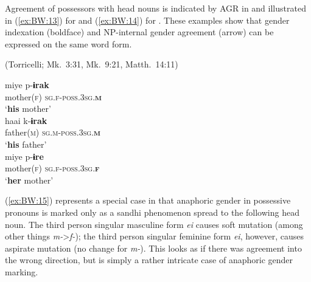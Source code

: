 \documentclass[output=collectionpaper]{langsci/langscibook}
\begin{document}
Agreement of possessors with head nouns is indicated by AGR in  and illustrated in (\ref{ex:BW:13}) for  and (\ref{ex:BW:14}) for . These examples show that gender indexation (boldface) and NP-internal gender agreement (arrow) can be expressed on the same word form.

%

\ea\label{ex:BW:14}
 (Torricelli; Mk.~3:31, Mk.~9:21, Matth.~14:11)\\
\begin{xlist}
\ex
\gll miye 	p-\textbf{ɨrak}\\
mother(\textsc{f})	{\textrightarrow\textsc{sg.f-poss.3sg.\textbf{m}}}\\
\glt ‘\textbf{his} mother’\\
\ex
\gll
haai 	k-\textbf{ɨrak}\\
father(\textsc{m})	{\textrightarrow\textsc{sg.m-poss.3sg.\textbf{m}}}\\
\glt ‘\textbf{his} father’\\
\ex
\gll miye 	p-\textbf{ɨre}\\
mother(\textsc{f})	{\textrightarrow\textsc{sg.f-poss.3sg.\textbf{f}}}\\
\glt ‘\textbf{her} mother’\\
\end{xlist}
\z

 (\ref{ex:BW:15}) represents a special case in that anaphoric gender in possessive pronouns is marked only as a sandhi phenomenon spread to the following head noun. The third person singular masculine form \textit{ei} causes soft mutation (among other things \textit{m-}>\textit{f-}); the third person singular feminine form \textit{ei}, however, causes aspirate mutation (no change for \textit{m-}). This looks as if there was agreement into the wrong direction, but is simply a rather intricate case of anaphoric gender marking.
\end{document}
